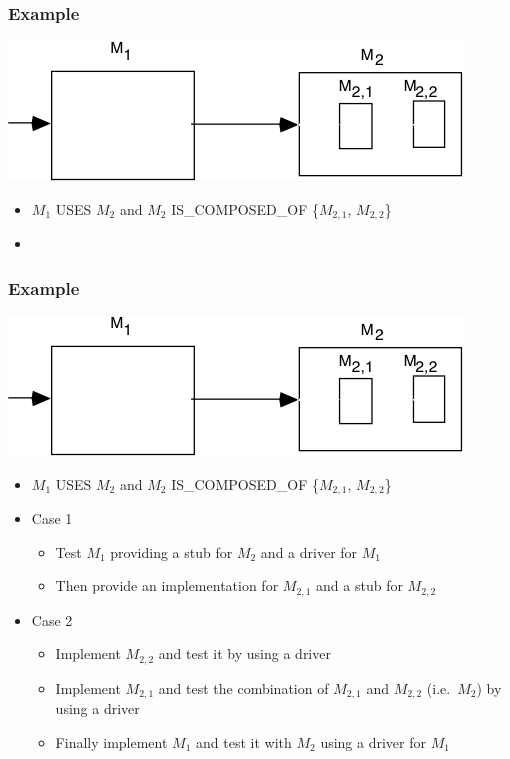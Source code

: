 \documentclass[t, 12pt, numbers, fleqn, handout]{beamer}
\begin{document}

\begin{frame}
\frametitle{Example \cite{GhezziEtAl2003}}

\begin{center}
\includegraphics[scale=0.35]{../Figures/Example.png}
\end{center}

\begin{itemize}
\item $M_1$ USES $M_2$ and $M_2$ IS\_COMPOSED\_OF \{$M_{2,1}$, $M_{2,2}$\}
\item {}
\end{itemize}
\end{frame}


\begin{frame}
\frametitle{Example \cite{GhezziEtAl2003}}

\begin{center}
\includegraphics[scale=0.35]{../Figures/Example.png}
\end{center}

\begin{itemize}
\item $M_1$ USES $M_2$ and $M_2$ IS\_COMPOSED\_OF \{$M_{2,1}$, $M_{2,2}$\}
\item Case 1
\begin{itemize}
\item Test $M_1$ providing a stub for $M_2$ and a driver for $M_1$
\item Then provide an implementation for $M_{2,1}$ and a stub for $M_{2,2}$
\end{itemize}
\item Case 2
\begin{itemize}
\item Implement $M_{2,2}$ and test it by using a driver
\item Implement $M_{2,1}$ and test the combination of $M_{2,1}$ and $M_{2,2}$
  (i.e.\ $M_2$) by using a driver
\item Finally implement $M_1$ and test it with $M_2$ using a driver for $M_1$
\end{itemize}
\end{itemize}
\end{frame}
\end{document}
